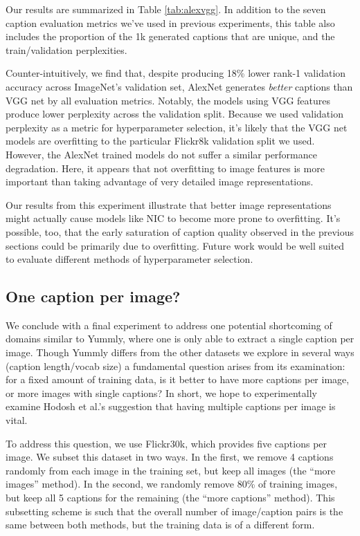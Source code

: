 \documentclass[11pt]{article}
\begin{document}
Our results are summarized in Table \ref{tab:alexvgg}. In addition to
the seven caption evaluation metrics we've used in previous
experiments, this table also includes the proportion of the 1k
generated captions that are unique, and the train/validation
perplexities.

Counter-intuitively, we find that, despite producing 18\% lower rank-1
validation accuracy across ImageNet's validation set, AlexNet
generates \emph{better} captions than VGG net by all evaluation
metrics. Notably, the models using VGG features produce lower
perplexity across the validation split. Because we used validation
perplexity as a metric for hyperparameter selection, it's likely that
the VGG net models are overfitting to the particular Flickr8k
validation split we used. However, the AlexNet trained models do not
suffer a similar performance degradation. Here, it appears that not
overfitting to image features is more important than taking advantage
of very detailed image representations.

Our results from this experiment illustrate that better image
representations might actually cause models like NIC to become more
prone to overfitting. It's possible, too, that the early saturation of
caption quality observed in the previous sections could be primarily
due to overfitting. Future work would be well suited to evaluate
different methods of hyperparameter selection.

\subsection{One caption per image?}
We conclude with a final experiment to address one potential
shortcoming of domains similar to Yummly, where one is only able to
extract a single caption per image. Though Yummly differs from the
other datasets we explore in several ways (caption length/vocab size)
a fundamental question arises from its examination: for a fixed amount
of training data, is it better to have more captions per image, or
more images with single captions? In short, we hope to experimentally
examine Hodosh et al.'s  suggestion that
having multiple captions per image is vital.

To address this question, we use Flickr30k, which provides five
captions per image. We subset this dataset in two ways. In the first,
we remove 4 captions randomly from each image in the training set, but
keep all images (the ``more images'' method). In the second, we
randomly remove 80\% of training images, but keep all 5 captions for
the remaining (the ``more captions'' method). This subsetting scheme
is such that the overall number of image/caption pairs is the same
between both methods, but the training data is of a different form.
\end{document}

